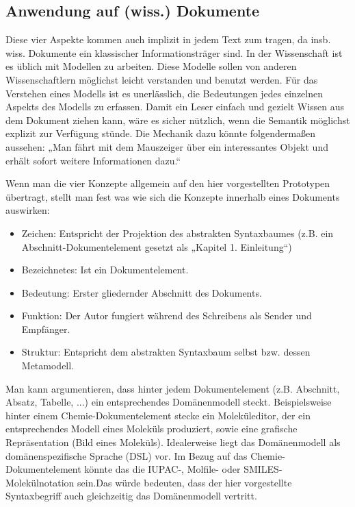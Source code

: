 \subsection{Anwendung auf (wiss.) Dokumente}\label{}
 
Diese vier Aspekte kommen auch implizit in jedem Text zum tragen, da insb. wiss. Dokumente ein klassischer Informationsträger sind. In der Wissenschaft ist es üblich mit Modellen zu arbeiten. Diese Modelle sollen von anderen Wissenschaftlern möglichst leicht verstanden und benutzt werden. Für das Verstehen eines Modells ist es unerlässlich, die Bedeutungen jedes einzelnen Aspekts des Modells zu erfassen. Damit ein Leser einfach und gezielt Wissen aus dem Dokument ziehen kann, wäre es sicher nützlich, wenn die Semantik möglichst explizit zur Verfügung stünde. Die Mechanik dazu könnte folgendermaßen aussehen: „Man fährt mit dem Mauszeiger über ein interessantes Objekt und erhält sofort weitere Informationen dazu.“

 
Wenn man die vier Konzepte allgemein auf den hier vorgestellten Prototypen übertragt, stellt man fest was wie sich die Konzepte innerhalb eines Dokuments auswirken:

 
\begin{itemize}

\item Zeichen: Entspricht der Projektion des abstrakten Syntaxbaumes (z.B. ein Abschnitt-Dokumentelement gesetzt als „Kapitel 1. Einleitung“)
\item Bezeichnetes: Ist ein Dokumentelement.
\item Bedeutung: Erster gliedernder Abschnitt des Dokuments.
\item Funktion: Der Autor fungiert während des Schreibens als Sender und Empfänger.
\item Struktur: Entspricht dem abstrakten Syntaxbaum selbst bzw. dessen Metamodell.
\end{itemize}
 
Man kann argumentieren, dass hinter jedem Dokumentelement (z.B. Abschnitt, Absatz, Tabelle, ...) ein entsprechendes Domänenmodell steckt. Beispielsweise hinter einem Chemie-Dokumentelement stecke ein Moleküleditor, der ein entsprechendes Modell eines Moleküls produziert, sowie eine grafische Repräsentation (Bild eines Moleküls). Idealerweise liegt das Domänenmodell als domänenspezifische Sprache (DSL) vor. Im Bezug auf das Chemie-Dokumentelement könnte das die IUPAC-, Molfile- oder SMILES-Molekülnotation sein.Das würde bedeuten, dass der hier vorgestellte Syntaxbegriff auch gleichzeitig das Domänenmodell vertritt.

